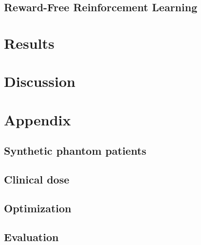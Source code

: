 \subsection{Reward-Free Reinforcement Learning}


\section{Results}

\section{Discussion}



\section*{Appendix}

\subsection*{Synthetic phantom patients}

\subsection*{Clinical dose}

\subsection*{Optimization}

\subsection*{Evaluation}
